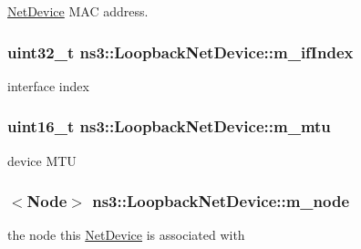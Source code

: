 \hyperlink{classns3_1_1NetDevice}{Net\+Device} M\+AC address. 

\subsubsection[{\texorpdfstring{m\+\_\+if\+Index}{m_ifIndex}}]{\setlength{\rightskip}{0pt plus 5cm}uint32\+\_\+t ns3\+::\+Loopback\+Net\+Device\+::m\+\_\+if\+Index\hspace{0.3cm}{\ttfamily [private]}}\hypertarget{classns3_1_1LoopbackNetDevice_a223d24d108f8a9dfba19aeb64bd8cfbc}{}\label{classns3_1_1LoopbackNetDevice_a223d24d108f8a9dfba19aeb64bd8cfbc}


interface index 

\subsubsection[{\texorpdfstring{m\+\_\+mtu}{m_mtu}}]{\setlength{\rightskip}{0pt plus 5cm}uint16\+\_\+t ns3\+::\+Loopback\+Net\+Device\+::m\+\_\+mtu\hspace{0.3cm}{\ttfamily [private]}}\hypertarget{classns3_1_1LoopbackNetDevice_ac2cecc3794c627c237c1ab9d2eca91db}{}\label{classns3_1_1LoopbackNetDevice_ac2cecc3794c627c237c1ab9d2eca91db}


device M\+TU 

\subsubsection[{\texorpdfstring{m\+\_\+node}{m_node}}]{$<${\bf Node}$>$ ns3\+::\+Loopback\+Net\+Device\+::m\+\_\+node\hspace{0.3cm}{\ttfamily [private]}}\hypertarget{classns3_1_1LoopbackNetDevice_a5f1f7506494670806071ca51f717f297}{}\label{classns3_1_1LoopbackNetDevice_a5f1f7506494670806071ca51f717f297}


the node this \hyperlink{classns3_1_1NetDevice}{Net\+Device} is associated with 

